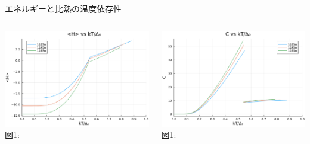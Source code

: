 \documentclass[aspectratio=169, 12pt, dvipdfmx]{beamer}
\begin{document}
\begin{frame}{エネルギーと比熱の温度依存性}
  \begin{columns}[totalwidth=1.0\linewidth]
    \begin{column}[T]{0.5\linewidth}
      \centering
      \includegraphics[width=\textwidth]{Comp_FT_H.pdf}
      \vspace{5pt} %
      \scriptsize 図1:
    \end{column}

  \begin{column}[T]{0.5\linewidth}
    \centering
    \includegraphics[width=\textwidth]{Comp_FT_C.pdf}
    \vspace{5pt} %
    \scriptsize 図1:
  \end{column}
  \end{columns}
\end{frame}
\end{document}
